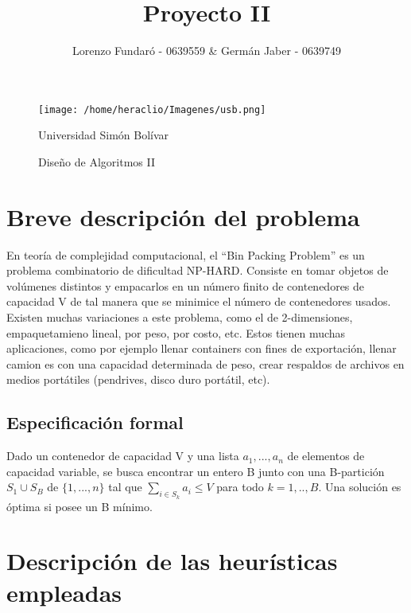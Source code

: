 \documentclass[a4paper,10pt]{article}
\title{Proyecto II}
\author{Lorenzo Fundar\'o - 0639559 & Germán Jaber - 0639749}
\begin{document}
\begin{figure}[t]
\begin{center}
\texttt{[image: /home/heraclio/Imagenes/usb.png]}
\end{center}
\begin{center}
\large Universidad Simón Bolívar
\end{center}
\begin{center}
 \large Diseño de Algoritmos II
\end{center}


\end{figure}


\maketitle

\thispagestyle{empty}
\newpage

\tableofcontents{}
\newpage

\section{Breve descripción del problema}

En teoría de complejidad computacional, el ``Bin Packing Problem'' es un problema combinatorio de dificultad NP-HARD. Consiste en tomar 
objetos de volúmenes distintos y empacarlos en un número finito de contenedores de capacidad V de tal manera que se minimice el número 
de contenedores usados. Existen muchas variaciones a este problema, como el de 2-dimensiones, empaquetamieno lineal, por peso, por costo, etc.
Estos tienen muchas aplicaciones, como por ejemplo llenar containers con fines de exportación, llenar camion es con una capacidad determinada 
de peso, crear respaldos de archivos en medios portátiles (pendrives, disco duro portátil, etc). 

\subsection{Especificación formal}

Dado un contenedor de capacidad V y una lista $a_1, ..., a_n$ de elementos de capacidad variable, se busca encontrar un entero 
B junto con una B-partición $S_1 \cup S_B$ de $\{1,...,n\}$ tal que $\sum_{i \in S_k}^{} {a_i \le V}$ para todo $k = 1,..,B$. 
Una solución es óptima si posee un B mínimo. 

\section{Descripción de las heurísticas empleadas}
\end{document}
